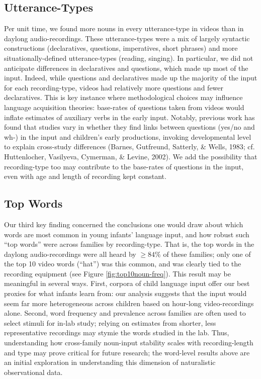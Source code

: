 \documentclass[man]{apa6}
\theoremstyle{definition}
\theoremstyle{definition}
\theoremstyle{definition}
\theoremstyle{remark}
\begin{document}
\subsection{Utterance-Types}\label{utterance-types}

Per unit time, we found more nouns in every utterance-type in videos
than in daylong audio-recordings. These utterance-types were a mix of
largely syntactic constructions (declaratives, questions, imperatives,
short phrases) and more situationally-defined utterance-types (reading,
singing). In particular, we did not anticipate differences in
declaratives and questions, which made up most of the input. Indeed,
while questions and declaratives made up the majority of the input for
each recording-type, videos had relatively more questions and fewer
declaratives. This is key instance where methodological choices may
influence language acquisition theories: base-rates of questions taken
from videos would inflate estimates of auxiliary verbs in the early
input. Notably, previous work has found that studies vary in whether
they find links between questions (yes/no and wh-) in the input and
children's early productions, invoking developmental level to explain
cross-study differences (Barnes, Gutfreund, Satterly, \& Wells, 1983;
cf. Huttenlocher, Vasilyeva, Cymerman, \& Levine, 2002). We add the
possibility that recording-type too may contribute to the base-rates of
questions in the input, even with age and length of recording kept
constant.

\subsection{Top Words}\label{top-words}

Our third key finding concerned the conclusions one would draw about
which words are most common in young infants' language input, and how
robust such \enquote{top words} were across families by recording-type.
That is, the top words in the daylong audio-recordings were all heard by
\(\geq84\%\) of these families; only one of the top 10 video words
(\enquote{hat}) was this common, and was clearly tied to the recording
equipment (see Figure \ref{fig:top10noun-freq}). This result may be
meaningful in several ways. First, corpora of child language input offer
our best proxies for what infants learn from: our analysis suggests that
the input would seem far more heterogeneous across children based on
hour-long video-recordings alone. Second, word frequency and prevalence
across families are often used to select stimuli for in-lab study;
relying on estimates from shorter, less representative recordings may
stymie the words studied in the lab. Thus, understanding how
cross-family noun-input stability scales with recording-length and type
may prove critical for future research; the word-level results above are
an initial exploration in understanding this dimension of naturalistic
observational data.
\end{document}
